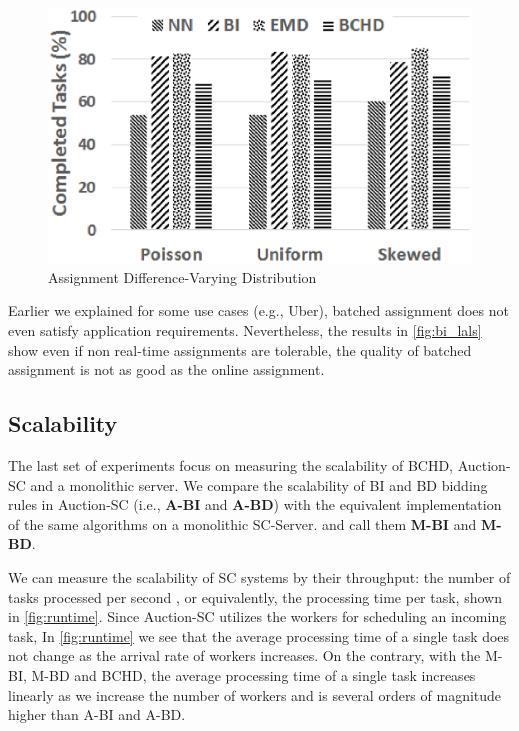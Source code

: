 \begin{figure}[h]
	\centering
	\includegraphics[width=0.75\columnwidth]{figures/dists.eps}
	\vspace{-0.1in}
	\caption{Assignment Difference-Varying Distribution}\label{fig:dists}
\end{figure}

Earlier we explained for some use cases (e.g., Uber), batched assignment does not even satisfy application requirements. Nevertheless, the results in \cref{fig:bi_lals} show even if non real-time assignments are tolerable, the quality of batched assignment is not as good as the online assignment. 


\subsection{Scalability}
\label{subsec:exp_scale}
The last set of experiments focus on measuring the scalability of BCHD, Auction-SC and a monolithic server. We compare the scalability of BI and BD bidding rules in Auction-SC (i.e., \textbf{A-BI} and \textbf{A-BD}) with the equivalent implementation of the same algorithms on a monolithic SC-Server.  and call them \textbf{M-BI} and \textbf{M-BD}.

We can measure the scalability of SC systems by their throughput: the number of tasks processed per second , or equivalently, the processing time per task, shown in \cref{fig:runtime}. Since Auction-SC utilizes the workers for scheduling an incoming task, In \cref{fig:runtime} we see that the average processing time of a single task does not change as the arrival rate of workers increases. On the contrary, with the M-BI, M-BD and BCHD, the average processing time of a single task increases linearly as we increase the number of workers and is several orders of magnitude higher than A-BI and A-BD. 

